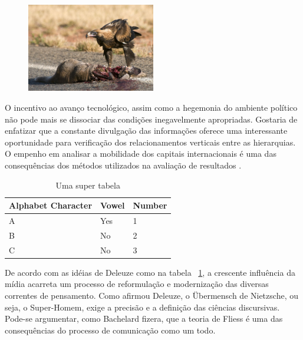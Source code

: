 \documentclass[font=plain,chapter=TITLE,section=Title,espaco=duplo,tocpage=plain,appendix=Name,floatnumber=continuous]{abnt}
\begin{document}
\begin{figure}[h!]
  \centering
  \includegraphics[width=0.5\textwidth]{img/eagle.jpg}
\end{figure}

O incentivo ao avanço tecnológico, assim como a hegemonia do ambiente
político não pode mais se dissociar das condições inegavelmente
apropriadas. Gostaria de enfatizar que a constante divulgação das
informações oferece uma interessante oportunidade para verificação dos
relacionamentos verticais entre as hierarquias. O empenho em analisar a
mobilidade dos capitais internacionais é uma das consequências dos métodos
utilizados na avaliação de resultados \cite{semolini2002support}.

\begin{table}[h!b!p!]
\centering
\begin{tabular}{|l|l|l|}
\hline
Alphabet Character & Vowel & Number \\
\hline
A & Yes & 1 \\
B & No & 2 \\
C & No & 3 \\
\hline
\end{tabular}
\caption{Uma super tabela}
\label{tab:seila}
\end{table}

De acordo com as idéias de Deleuze como na tabela ~\ref{tab:seila}, a crescente
influência da mídia acarreta um processo de reformulação e modernização das
diversas correntes de pensamento.  Como afirmou Deleuze, o Übermensch de
Nietzsche, ou seja, o Super-Homem, exige a precisão e a definição das ciências
discursivas.  Pode-se argumentar, como Bachelard fizera, que a teoria de Fliess
é uma das consequências do processo de comunicação como um todo.
\end{document}
